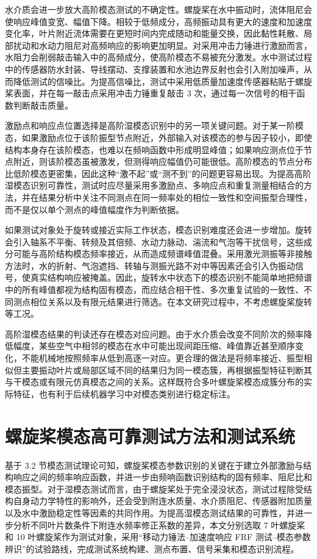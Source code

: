 水介质会进一步放大高阶模态测试的不确定性。螺旋桨在水中振动时，流体阻尼会使响应峰值变宽、幅值下降。相较于低频成分，高频振动具有更大的速度和加速度变化率，叶片附近流体需要在更短时间内完成随动和能量交换，因此黏性耗散、局部扰动和水动力阻尼对高频响应的影响更加明显。对采用冲击力锤进行激励而言，水阻力会削弱敲击输入中的高频成分，使高阶模态不易被充分激发。水中测试过程中的传感器防水封装、导线摆动、支撑装置和水池边界反射也会引入附加噪声，从而降低测试的信噪比。为提高信噪比，测试中采用低质量加速度传感器粘贴于螺旋桨表面，并在每一敲击点采用冲击力锤重复敲击 3 次，通过每一次信号的相干函数判断敲击质量。

激励点和响应点位置选择是高阶湿模态识别中的另一项关键问题。对于某一阶模态，如果激励点位于该阶振型节点附近，外部输入对该模态的参与因子较小，即使结构本身存在该阶模态，也难以在频响函数中形成明显峰值；如果响应测点位于节点附近，则该阶模态虽被激发，但测得响应幅值仍可能很低。高阶模态的节点分布比低阶模态更密集，因此这种“激不起”或“测不到”的问题更容易出现。为提高高阶湿模态识别可靠性，测试时应尽量采用多激励点、多响应点和重复测量相结合的方法，并在结果分析中关注不同测点在同一频率处的相位一致性和空间振型合理性，而不是仅以单个测点的峰值幅度作为判断依据。

如果测试对象处于旋转或接近实际工作状态，模态识别难度还会进一步增加。旋转会引入轴系不平衡、转频及其倍频、水动力脉动、湍流和气泡等干扰信号，这些成分可能与高阶结构模态频率接近，从而造成频谱峰值混叠。采用激光测振等非接触方法时，水的折射、气泡遮挡、转轴与测振光路不对中等因素还会引入伪振动信号，使真实结构响应被掩盖\cite{test:23,test:25}。因此，旋转水中状态下的模态识别不能简单地把频谱中的所有峰值都视为结构固有模态，而应结合相干性、多次重复试验的一致性、不同测点相位关系以及有限元结果进行筛选。在本文研究过程中，不考虑螺旋桨旋转等工况。

高阶湿模态结果的判读还存在模态对应问题。由于水介质会改变不同阶次的频率降低幅度，某些空气中相邻的模态在水中可能出现间距压缩、峰值靠近甚至顺序变化，不能机械地按照频率从低到高逐一对应。更合理的做法是将频率接近、振型相似但主要振动叶片或局部区域不同的结果归为同一模态簇，再根据振型特征判断其与干模态或有限元仿真模态之间的关系。这样既符合多叶螺旋桨模态成簇分布的实际特征，也有利于后续机器学习中对模态类别进行稳定标注。

\section{螺旋桨模态高可靠测试方法和测试系统}

基于 3.2 节模态测试理论可知，螺旋桨模态参数识别的关键在于建立外部激励与结构响应之间的频率响应函数，并进一步由频响函数识别结构的固有频率、阻尼比和模态振型。对于湿模态测试而言，由于螺旋桨处于完全浸没状态，测试过程除受结构自身动力学特性的影响外，还会受到附连水质量、水介质阻尼、传感器附加质量以及水中激励稳定性等因素的共同作用。为提高湿模态测试结果的可靠性，并进一步分析不同叶片数条件下附连水频率修正系数的差异，本文分别选取 7 叶螺旋桨和 10 叶螺旋桨作为测试对象，采用“移动力锤法--加速度响应 FRF 测试--模态参数辨识”的试验路线，完成测试系统构建、测点布置、信号采集和模态识别流程。

